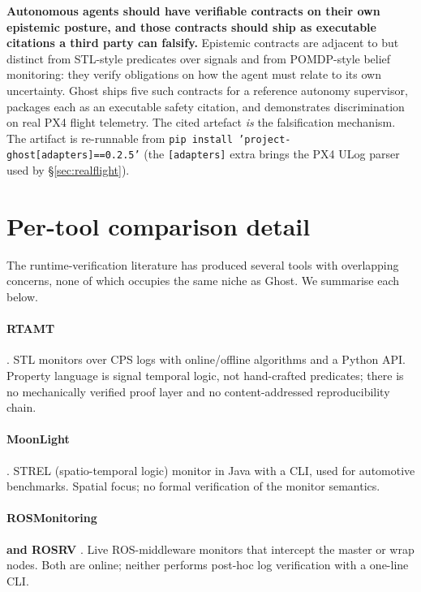 \documentclass[11pt,a4paper]{article}
\begin{document}
\textbf{Autonomous agents should have verifiable contracts on
their own epistemic posture, and those contracts should ship as
executable citations a third party can falsify.} Epistemic
contracts are adjacent to but distinct from STL-style predicates
over signals and from POMDP-style belief monitoring: they verify
obligations on how the agent must relate to its own uncertainty.
Ghost ships five such contracts for a reference autonomy
supervisor, packages each as an executable safety citation, and
demonstrates discrimination on real PX4 flight telemetry. The
cited artefact \emph{is} the falsification mechanism. The artifact
is re-runnable from
\texttt{pip install 'project-ghost[adapters]==0.2.5'} (the
\texttt{[adapters]} extra brings the PX4 ULog parser used by
\S\ref{sec:realflight}).




\appendix

\section{Per-tool comparison detail}
\label{app:comparison}

The runtime-verification literature has produced several tools
with overlapping concerns, none of which occupies the same niche
as Ghost. We summarise each below.

\paragraph{RTAMT} \cite{rtamt2020}.
STL monitors over CPS logs with online/offline algorithms and a
Python API. Property language is signal temporal logic, not
hand-crafted predicates; there is no mechanically verified proof
layer and no content-addressed reproducibility chain.

\paragraph{MoonLight} \cite{moonlight2020}.
STREL (spatio-temporal logic) monitor in Java with a CLI, used
for automotive benchmarks. Spatial focus; no formal verification
of the monitor semantics.

\paragraph{ROSMonitoring} \cite{rosmonitoring2020} \textbf{and ROSRV}
\cite{rosrv2014}.
Live ROS-middleware monitors that intercept the master or wrap
nodes. Both are online; neither performs post-hoc log
verification with a one-line CLI.
\end{document}
